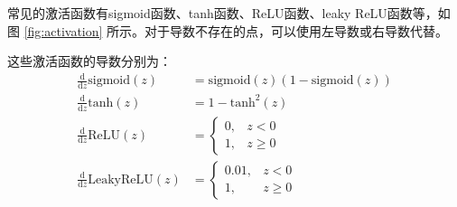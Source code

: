 常见的激活函数有sigmoid函数、tanh函数、ReLU函数、leaky ReLU函数等，如图 \ref{fig:activation} 所示。对于导数不存在的点，可以使用左导数或右导数代替。

\begin{figure*}[h!b]
	\centering

	\centering
	\caption{Activation Functions 激活函数}
	\label{fig:activation}
\end{figure*}

这些激活函数的导数分别为：
\begin{equation}
	\begin{aligned}
		\frac{\mathrm{d}}{\mathrm{d}z}\mathrm{sigmoid}(z) &= \mathrm{sigmoid}(z)\left(1-\mathrm{sigmoid}(z)\right) \\
		\frac{\mathrm{d}}{\mathrm{d}z}\mathrm{tanh}(z) &= 1 - \mathrm{tanh}^2(z) \\
		\frac{\mathrm{d}}{\mathrm{d}z}\mathrm{ReLU}(z) &= 
			\begin{cases}
				0, &z < 0 \\
				1, &z \geqslant 0
			\end{cases}\\
		\frac{\mathrm{d}}{\mathrm{d}z}\mathrm{LeakyReLU}(z) &= 
			\begin{cases}
				0.01, &z < 0 \\
				1, &z \geqslant 0
			\end{cases}
	\end{aligned}
\end{equation}

